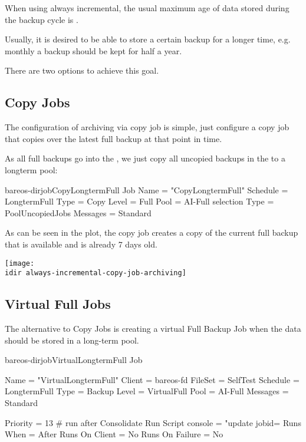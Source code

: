 When using always incremental, the usual maximum age of data stored during the backup cycle is .

Usually, it is desired to be able to store a certain backup for a longer time, e.g. monthly a backup should be kept for half a year.

There are two options to achieve this goal.

\subsection{Copy Jobs}

The configuration of archiving via copy job is simple, just configure a copy job that copies over the latest full backup
at that point in time.

As all full backups go into the , we just copy all uncopied backups in the  to a longterm pool:

\begin{bareosConfigResource}{bareos-dir}{job}{CopyLongtermFull}
Job {
  Name = "CopyLongtermFull"
  Schedule = LongtermFull
  Type = Copy
  Level = Full
  Pool = AI-Full
  selection Type = PoolUncopiedJobs
  Messages = Standard
}
\end{bareosConfigResource}

As can be seen in the plot, the copy job creates a copy of the current full backup that is available and is already 7 days old.
\begin{center}
\texttt{[image: \\idir always-incremental-copy-job-archiving]}
\end{center}


\subsection{Virtual Full Jobs}

The alternative to Copy Jobs is creating a virtual Full Backup Job when the data should be stored in a long-term pool.

\begin{bareosConfigResource}{bareos-dir}{job}{VirtualLongtermFull}
Job {
  Name = "VirtualLongtermFull"
  Client = bareos-fd
  FileSet = SelfTest
  Schedule = LongtermFull
  Type = Backup
  Level = VirtualFull
  Pool = AI-Full
  Messages = Standard

  Priority = 13                 # run after  Consolidate
  Run Script {
        console = "update jobid=%
        Runs When = After
        Runs On Client = No
        Runs On Failure = No
  }
}
\end{bareosConfigResource}


